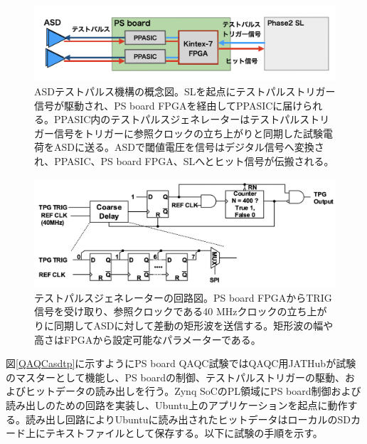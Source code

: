 \begin{figure} 
\centering
\includegraphics[width=16cm]{fig/QAQC/PSBasdtp.png}
\caption[ASDテストパルスの概念図]{ASDテストパルス機構の概念図。SLを起点にテストパルストリガー信号が駆動され、PS board FPGAを経由してPPASICに届けられる。PPASIC内のテストパルスジェネレーターはテストパルストリガー信号をトリガーに参照クロックの立ち上がりと同期した試験電荷をASDに送る。ASDで閾値電圧を信号はデジタル信号へ変換され、PPASIC、PS board FPGA、SLへとヒット信号が伝搬される。}
\label{PSBasdtp}
\end{figure}

\begin{figure} 
    \centering
    \includegraphics[width=16cm]{fig/QAQC/PSBtpg.png}
    \caption[テストパルスジェネレーターの回路図]{テストパルスジェネレーターの回路図。PS board FPGAからTRIG信号を受け取り、参照クロックである40 MHzクロックの立ち上がりに同期してASDに対して差動の矩形波を送信する。矩形波の幅や高さはFPGAから設定可能なパラメーターである。}
    \label{PSBtpg}
\end{figure}

図\ref{QAQCasdtp}に示すようにPS board QAQC試験ではQAQC用JATHubが試験のマスターとして機能し、PS boardの制御、テストパルストリガーの駆動、およびヒットデータの読み出しを行う。Zynq SoCのPL領域にPS board制御および読み出しのための回路を実装し、Ubuntu上のアプリケーションを起点に動作する。読み出し回路によりUbuntuに読み出されたヒットデータはローカルのSDカード上にテキストファイルとして保存する。以下に試験の手順を示す。

